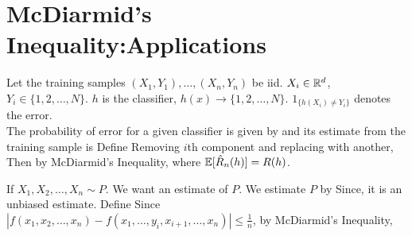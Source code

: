 \documentclass[all-lectures.tex]{subfiles}
\begin{document}

\setcounter{section}{3}
\setcounter{subsection}{1}

\section*{}
\chr
\section{McDiarmid's Inequality:Applications} 
\begin{exmp}
Let the training samples $(X_1, Y_1), \dots, (X_n,Y_n)$ be iid. $X_i \in \mathbb{R}^d$, $Y_i \in \{1, 2, \dots, N\}$.
$h$  is the classifier, $h(x) \to \{1, 2, \dots, N\}$. 
$1_{\{h(X_i) \neq Y_i\}}$ denotes the error.\\
The probability of error for a given classifier is given by
and its estimate from the training sample is 
Define
Removing $i$th component and replacing with another,
Then by McDiarmid's Inequality,
where $\mathbb{E}[\hat{R}_n(h)] = R(h)$.
\end{exmp}

\begin{exmp}
If $X_1, X_2, \dots, X_n \sim P$. We want an estimate of $P$.
 We estimate $P$ by 
Since,
it is an unbiased estimate. Define
Since $|f(x_1, x_2, \dots, x_n) - f(x_1, \dots,y_i, x_{i+1}, \dots, x_n)| \le  \frac{1}{n}$,
by  McDiarmid's Inequality,
\end{exmp}
\end{document}

